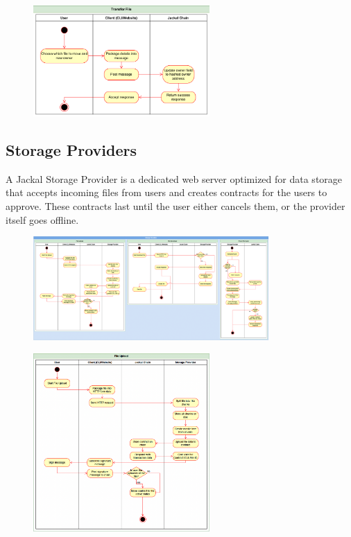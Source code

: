 \documentclass[a4paper]{article}
\begin{document}
\begin{figure}[!htbp]
\centering
\includegraphics[width=0.6\textwidth]{assets/filetree9.png}
\end{figure}

\newpage
\subsection{Storage Providers}
A Jackal Storage Provider is a dedicated web server optimized for data storage that accepts incoming files from users and creates contracts for the users to approve. These contracts last until the user either cancels them, or the provider itself goes offline.

\begin{figure}[!htbp]
\centering
\includegraphics[width=0.8\textwidth]{assets/providers1.png}
\end{figure}

\begin{figure}[!htbp]
\centering
\includegraphics[width=0.6\textwidth]{assets/providers2.png}
\end{figure}
\end{document}
